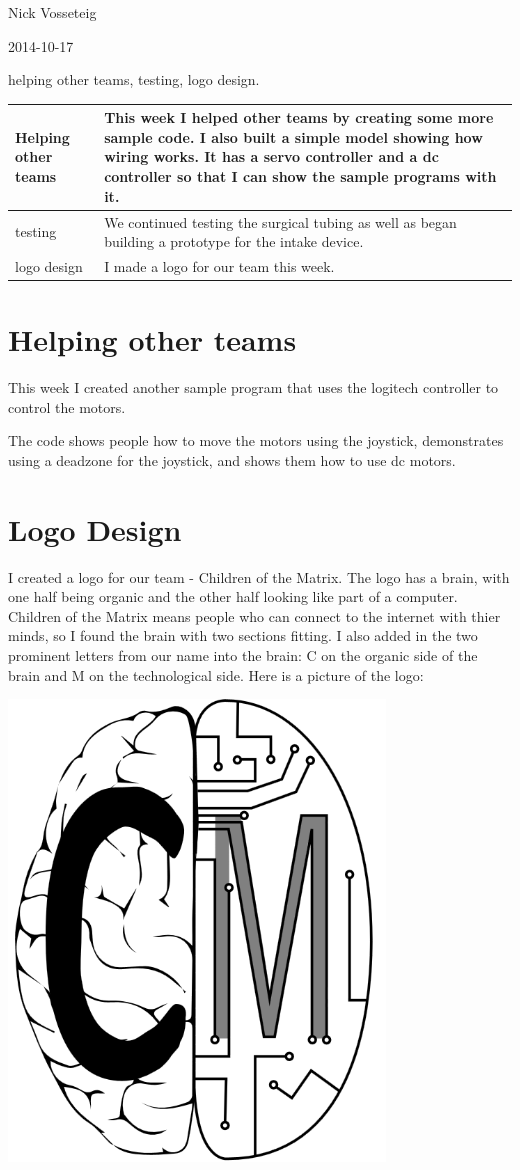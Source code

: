 \usepackage{listings}

Nick Vosseteig

2014-10-17

helping other teams, testing, logo design.

\begin{tabular}{|p{5cm}|p{5cm}|}
 \hline
 Helping other teams&
This week I helped other teams by creating some more sample code. I also built a simple model showing how wiring works. It has a servo controller and a dc controller so that I can show the sample programs with it. 
 \\
 \hline
testing&
We continued testing the surgical tubing as well as began building a prototype for the intake device.
 \\
 \hline
 logo design&
I made a logo for our team this week.
 \\
 \hline
\end{tabular}

\section*{Helping other teams}
This week I created another sample program that uses the logitech controller to control the motors.



The code shows people how to move the motors using the joystick, demonstrates using a deadzone for the joystick, and shows them how to use dc motors.

\section*{Logo Design}
I created a logo for our team - Children of the Matrix. The logo has a brain, with one half being organic and the other half looking like part of a computer. Children of the Matrix means people who can connect to the internet with thier minds, so I found the brain with two sections fitting. I also added in the two prominent letters from our name into the brain: C on the organic side of the brain and M on the technological side.
Here is a picture of the logo:


\begin{center}
 \includegraphics[width=10cm]{./Entries/Images/logo.png}
\end{center}
